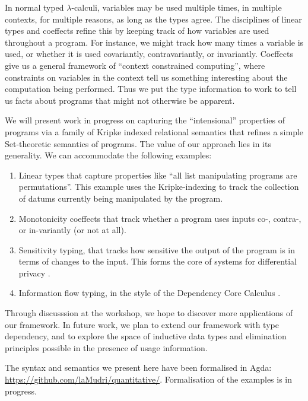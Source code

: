 In normal typed $\lambda$-calculi, variables may be used multiple
times, in multiple contexts, for multiple reasons, as long as the
types agree. The disciplines of linear types \cite{girard87linear} and
coeffects \cite{PetricekOM14,BrunelGMZ14,GhicaS14} refine this by
keeping track of how variables are used throughout a program. For
instance, we might track how many times a variable is used, or whether
it is used covariantly, contravariantly, or invariantly. Coeffects
give us a general framework of ``context constrained computing'',
where constraints on variables in the context tell us something
interesting about the computation being performed. Thus we put the
type information to work to tell us facts about programs that might
not otherwise be apparent.

We will present work in progress on capturing the ``intensional''
properties of programs via a family of Kripke indexed relational
semantics that refines a simple Set-theoretic semantics of
programs. The value of our approach lies in its generality. We can
accommodate the following examples:
\begin{enumerate}
\item Linear types that capture properties like ``all list
  manipulating programs are permutations''. This example uses the
  Kripke-indexing to track the collection of datums currently being
  manipulated by the program.
\item Monotonicity coeffects that track whether a program uses inputs
  co-, contra-, or in-variantly (or not at all).
\item Sensitivity typing, that tracks how sensitive the output of the
  program is in terms of changes to the input. This forms the core of
  systems for differential privacy \cite{reed10distance}.
\item Information flow typing, in the style of the Dependency Core
  Calculus \cite{abadi99core}.
\end{enumerate}
Through discusssion at the workshop, we hope to discover more
applications of our framework. In future work, we plan to extend our
framework with type dependency, and to explore the space of inductive
data types and elimination principles possible in the presence of
usage information.

The syntax and semantics we present here have been formalised in Agda:
\url{https://github.com/laMudri/quantitative/}. Formalisation of the
examples is in progress.

